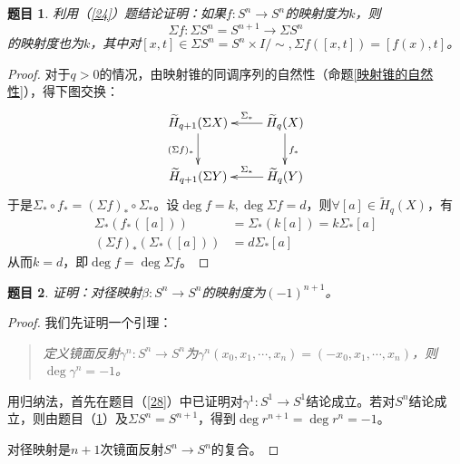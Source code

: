 \documentclass[UTF-8,11pt,fancyhdr,hyperref,titlepage]{ctexart}
\newcommand{\red}{\color{red}}
\theoremstyle{question}
\newtheorem{timu}{题目}
\theoremstyle{theorem}
\theoremstyle{definition}
\theoremstyle{remark}
\def\longto{\longrightarrow}
\def\To{\longto}
\newcommand{\rH}[1]{\widetilde{H}_{#1}}
\begin{document}
\begin{timu}\label{29}
  利用（\ref{24}）题结论证明：如果$f\colon S^n\To S^n$的映射度为$k$，则
  \begin{equation*}
  \Sigma f\colon \Sigma S^n=S^{n+1}\To \Sigma S^n
  \end{equation*}
的映射度也为$k$，其中对$[x,t]\in\Sigma S^n=S^n\times I/\sim, \Sigma f([x,t])=[f(x),t]$。
\end{timu}
\begin{proof}
  对于$q>0$的情况，由映射锥的同调序列的自然性（命题\ref{映射锥的自然性}），得下图交换：
  \begin{displaymath}
    \xymatrix{
      \rH{q+1}(\Sigma X) \ar[d]_{(\Sigma f)_{\ast}} & \rH{q}(X) \ar[l]_-{\Sigma_{\ast}} \ar[d]^{f_{\ast}} \\
      \rH{q+1}(\Sigma Y) & \rH{q}(Y) \ar[l]_-{\Sigma_{\ast}}  }
  \end{displaymath}
  于是$\Sigma_{\ast}\circ f_{\ast}=(\Sigma f)_{\ast}\circ \Sigma_{\ast}$。设$\deg f=k,\deg \Sigma f=d$，则$\forall [a]\in\rH{q}(X)$，有
  \begin{align*}
    \Sigma_{\ast}( f_{\ast} ([a]))& =\Sigma_{\ast}(k[a])=k\Sigma_{\ast}[a] \\
    (\Sigma f)_{\ast}( \Sigma_{\ast} ([a]))& =d\Sigma_{\ast}[a]
  \end{align*}
  从而$k=d$，即$\deg f=\deg \Sigma f$。
\end{proof}

\begin{timu}\label{30}
  证明：对径映射$\beta\colon S^n\To S^n$的映射度为$(-1)^{n+1}$。
\end{timu}
\begin{proof}
  我们先证明一个引理：
  \begin{quote}
    \emph{定义{\red 镜面反射}$\gamma^n\colon S^n\To S^n$为$\gamma^n(x_0,x_1,\cdots,x_n)=(-x_0,x_1,\cdots,x_n)$，则$\deg \gamma^n=-1$。}
  \end{quote}

  用归纳法，首先在题目（\ref{28}）中已证明对$\gamma^1\colon S^1\To S^1$结论成立。若对$S^n$结论成立，则由题目（\ref{29}）及$\Sigma S^n=S^{n+1}$，得到$\deg r^{n+1}=\deg r^n=-1$。

  对径映射是$n+1$次镜面反射$S^n\To S^n$的复合。
\end{proof}





\newpage
{}
\printindex
\end{document}
